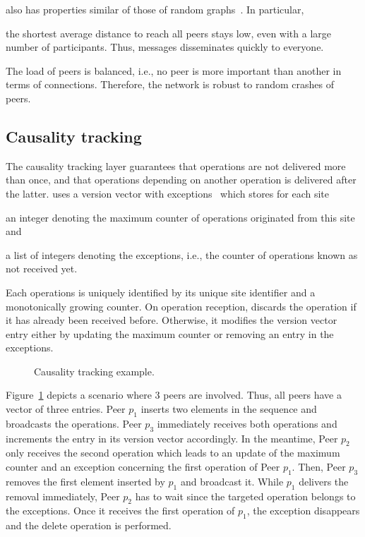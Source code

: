 \SPRAY also has properties similar of those of random
graphs~\cite{erdos1959random}. In particular,
\begin{inparaenum}[(i)]
\item the shortest average distance to reach all peers stays low, even with a
  large number of participants. Thus, messages disseminates quickly to everyone.
\item The load of peers is balanced, i.e., no peer is more important than
  another in terms of connections. Therefore, the network is robust to random
  crashes of peers.
\end{inparaenum}

\subsection{Causality tracking}
The causality tracking layer guarantees that operations are not delivered more
than once, and that operations depending on another operation is delivered after
the latter. \CRATE uses a version vector with
exceptions~\cite{malkhi2007concise} which stores for each site
\begin{inparaenum}[(i)]
\item an integer denoting the maximum counter of operations originated from this
  site and
\item a list of integers denoting the exceptions, i.e., the counter of
  operations known as not received yet.
\end{inparaenum}

Each operations is uniquely identified by its unique site identifier and a
monotonically growing counter. On operation reception, \CRATE discards the
operation if it has already been received before. Otherwise, it modifies the
version vector entry either by updating the maximum counter or removing an entry
in the exceptions.

\begin{figure}
  
  \caption{\label{fig:timeline}Causality tracking example.}
\end{figure}

Figure~\ref{fig:timeline} depicts a scenario where 3 peers are involved. Thus,
all peers have a vector of three entries. Peer $p_1$ inserts two elements in the
sequence and broadcasts the operations. Peer $p_3$ immediately receives both
operations and increments the entry in its version vector accordingly.  In the
meantime, Peer $p_2$ only receives the second operation which leads to an update
of the maximum counter and an exception concerning the first operation of Peer
$p_1$. Then, Peer $p_3$ removes the first element inserted by $p_1$ and
broadcast it. While $p_1$ delivers the removal immediately, Peer $p_2$ has to
wait since the targeted operation belongs to the exceptions. Once it receives
the first operation of $p_1$, the exception disappears and the delete operation
is performed.

